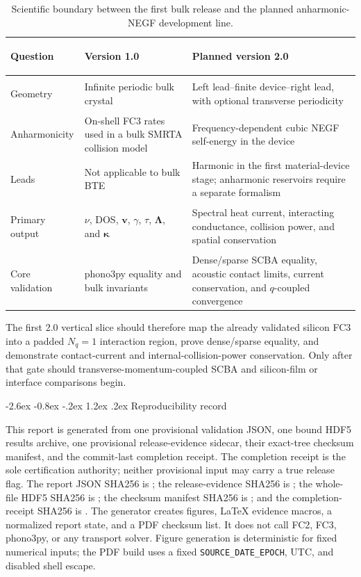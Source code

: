 \documentclass[11pt,a4paper]{article}
\makeatletter
\renewcommand\section{\@startsection{section}{1}{\z@}%
  {-2.6ex \@plus -0.8ex \@minus -.2ex}%
  {1.2ex \@plus .2ex}%
  {\normalfont\Large\sffamily\bfseries\color{ink}}}
\newcommand{\vect}[1]{\bm{#1}}
\newcommand{\code}[1]{\texttt{#1}}
\makeatother
\begin{document}
\begin{table}[htbp]
\centering
\caption{Scientific boundary between the first bulk release and the planned
anharmonic-NEGF development line.}
\small
\begin{tabularx}{\textwidth}{>{\bfseries\raggedright\arraybackslash}p{} >{\raggedright\arraybackslash}X >{\raggedright\arraybackslash}X}
\toprule
Question & Version 1.0 & Planned version 2.0 \\
\midrule
Geometry & Infinite periodic bulk crystal & Left lead--finite device--right lead, with optional transverse periodicity \\
Anharmonicity & On-shell FC3 rates used in a bulk SMRTA collision model & Frequency-dependent cubic NEGF self-energy in the device \\
Leads & Not applicable to bulk BTE & Harmonic in the first material-device stage; anharmonic reservoirs require a separate formalism \\
Primary output & $\nu$, DOS, $\vect{v}$, $\gamma$, $\tau$, $\vect{\Lambda}$, and $\bm{\kappa}$ & Spectral heat current, interacting conductance, collision power, and spatial conservation \\
Core validation & phono3py equality and bulk invariants & Dense/sparse SCBA equality, acoustic contact limits, current conservation, and $q$-coupled convergence \\
\bottomrule
\end{tabularx}
\end{table}

The first 2.0 vertical slice should therefore map the already validated silicon
FC3 into a padded $N_q=1$ interaction region, prove dense/sparse equality, and
demonstrate contact-current and internal-collision-power conservation. Only
after that gate should transverse-momentum-coupled SCBA and silicon-film or
interface comparisons begin.

\clearpage
\section{Reproducibility record}

This report is generated from one provisional validation JSON, one bound HDF5
results archive, one provisional release-evidence sidecar, their exact-tree
checksum manifest, and the commit-last completion receipt. The completion
receipt is the sole certification authority; neither provisional input may
carry a true release flag.
The report JSON SHA256 is \ValidationJSONSHA; the release-evidence SHA256 is
\ReleaseEvidenceSHA; the whole-file HDF5 SHA256 is \ResultsHDFSHA; the checksum
manifest SHA256 is \ChecksumManifestSHA; and the completion-receipt SHA256 is
\CompletionReceiptSHA. The generator creates figures, LaTeX evidence macros,
a normalized report state, and a PDF checksum list. It
does not call FC2, FC3, phono3py, or any transport solver. Figure generation is
deterministic for fixed numerical inputs; the PDF build uses a fixed
\code{SOURCE\_DATE\_EPOCH}, UTC, and disabled shell escape.
\end{document}
